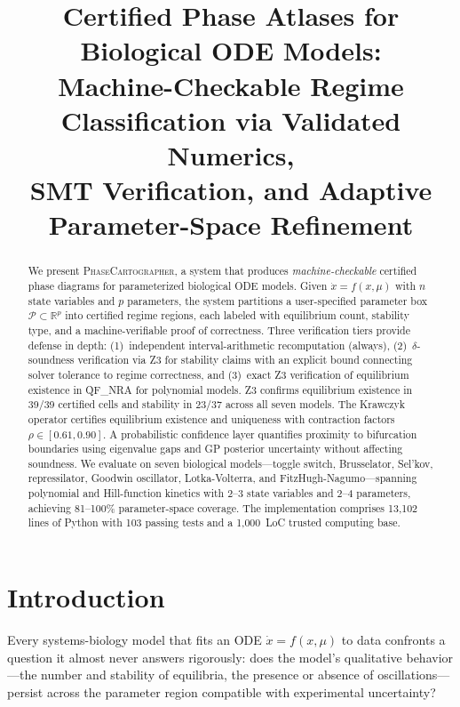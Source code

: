 \documentclass[11pt]{article}
\title{Certified Phase Atlases for Biological ODE Models:\\
Machine-Checkable Regime Classification via Validated Numerics,\\SMT Verification, and Adaptive Parameter-Space Refinement}
\date{}
\newcommand{\R}{\mathbb{R}}
\newcommand{\PC}{\textsc{PhaseCartographer}}
\begin{document}
\maketitle

\begin{abstract}
We present \PC{}, a system that produces \emph{machine-checkable} certified phase diagrams for parameterized biological ODE models.
Given $\dot{x} = f(x, \mu)$ with $n$ state variables and $p$ parameters, the system partitions a user-specified parameter box $\mathcal{P} \subset \R^p$ into certified regime regions, each labeled with equilibrium count, stability type, and a machine-verifiable proof of correctness.
Three verification tiers provide defense in depth: (1)~independent interval-arithmetic recomputation (always), (2)~$\delta$-soundness verification via Z3 for stability claims with an explicit bound connecting solver tolerance to regime correctness, and (3)~exact Z3 verification of equilibrium existence in QF\_NRA for polynomial models.
Z3 confirms equilibrium existence in 39/39 certified cells and stability in 23/37 across all seven models.
The Krawczyk operator certifies equilibrium existence and uniqueness with contraction factors $\rho \in [0.61, 0.90]$.
A probabilistic confidence layer quantifies proximity to bifurcation boundaries using eigenvalue gaps and GP posterior uncertainty without affecting soundness.
We evaluate on seven biological models---toggle switch, Brusselator, Sel'kov, repressilator, Goodwin oscillator, Lotka-Volterra, and FitzHugh-Nagumo---spanning polynomial and Hill-function kinetics with 2--3 state variables and 2--4 parameters, achieving 81--100\% parameter-space coverage.
The implementation comprises 13,102 lines of Python with 103 passing tests and a 1,000~LoC trusted computing base.
\end{abstract}

\section{Introduction}
\label{sec:intro}

Every systems-biology model that fits an ODE $\dot{x} = f(x, \mu)$ to data confronts a question it almost never answers rigorously: does the model's qualitative behavior---the number and stability of equilibria, the presence or absence of oscillations---persist across the parameter region compatible with experimental uncertainty?
\end{document}
